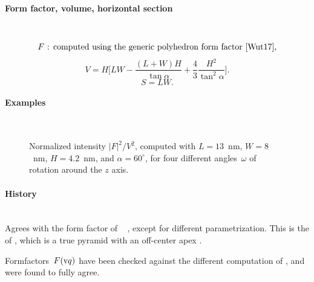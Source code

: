 \paragraph{Form factor, volume, horizontal section}\strut\\
\begin{equation*}
  F \text{~: computed using the generic polyhedron form factor~\cite{Wut17},}
\end{equation*}
\begin{equation*}
  V= H \Big[LW - \dfrac{(L + W)H}{\tan\alpha} + \dfrac{4}{3} \dfrac{H^2}{\tan^2\alpha}\Big].
\end{equation*}
\begin{equation*}
  S=LW.
\end{equation*}

\paragraph{Examples}\strut\\
\begin{figure}[H]
\begin{center}
\end{center}
\caption{Normalized intensity $|F|^2/V^2$,
computed with $L=13$~nm, $W=8$~nm, $H=4.2$~nm, and $\alpha=60^\circ$,
for four different angles~$\omega$ of rotation around the $z$ axis.}
\label{fig:FFAnisoPyramidEx}
\end{figure}

\paragraph{History}\strut\\
Agrees with the  form factor of \IsGISAXS\
\cite[Eq.~2.40]{Laz06} \cite[Eq.~217]{ReLL09},
except for different parametrization.
This is  the  of \FitGISAXS,
which is a true pyramid with an off-center apex \cite{Bab13}.

Formfactors~$F(\text{v}{q})$ have been checked against the different computation of \IsGISAXS,
and were found to fully agree.

\ffsection{Box (cuboid)} \label{SBox}
\index{Box}

